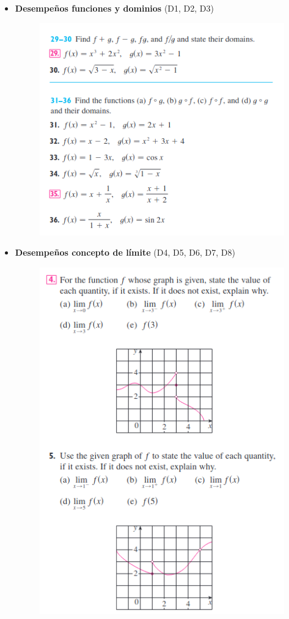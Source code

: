 \documentclass[spanish,12pt,a4paper]{article}
\begin{document}
	\begin{itemize}
		\item \textbf{Desempeños funciones y dominios} (D1, D2, D3)
		
		\begin{figure}[h]
			\includegraphics[scale=0.9]{funciones.png}
		\end{figure}
		\newpage
		\item \textbf{Desempeños concepto de límite} (D4, D5, D6, D7, D8)
		
		\begin{figure}[h!]
			\includegraphics[scale = 0.9]{concepto_de_limite.png}\\
		\end{figure}
		

\end{itemize}
\end{document}
